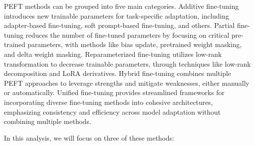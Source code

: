 PEFT methods can be grouped into five main categories. Additive fine-tuning introduces new trainable parameters for task-specific adaptation, including adapter-based fine-tuning, soft prompt-based fine-tuning, and others. Partial fine-tuning reduces the number of fine-tuned parameters by focusing on critical pre-trained parameters, with methods like bias update, pretrained weight masking, and delta weight masking. Reparameterized fine-tuning utilizes low-rank transformation to decrease trainable parameters, through techniques like low-rank decomposition and LoRA derivatives. Hybrid fine-tuning combines multiple PEFT approaches to leverage strengths and mitigate weaknesses, either manually or automatically. Unified fine-tuning provides streamlined frameworks for incorporating diverse fine-tuning methods into cohesive architectures, emphasizing consistency and efficiency across model adaptation without combining multiple methods.

In this analysis, we will focus on three of these methods:



